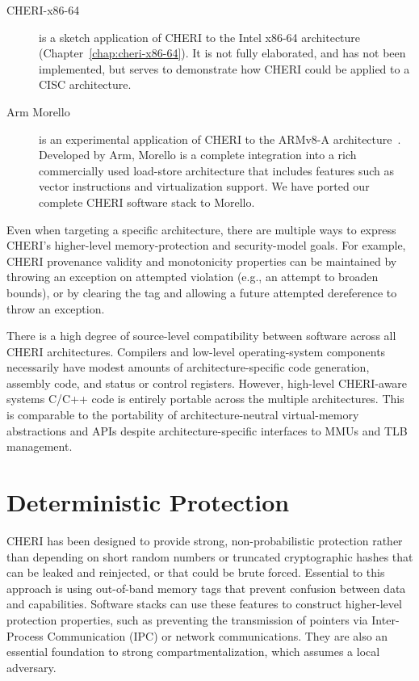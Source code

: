 \begin{description}
\item[CHERI-x86-64] is a sketch application of CHERI to the Intel x86-64
  architecture (Chapter~\ref{chap:cheri-x86-64}).
  It is not fully elaborated, and has not been implemented, but serves to
  demonstrate how CHERI could be applied to a CISC architecture.

\item[Arm Morello] is an experimental application of CHERI to the ARMv8-A
  architecture~\cite{arm-morello}.  Developed by Arm, Morello is a complete
  integration into
  a rich commercially used load-store architecture that includes features
  such as vector instructions and virtualization support.
  We have ported our complete CHERI software stack to Morello.
\end{description}

Even when targeting a specific architecture, there are multiple ways to
express CHERI's higher-level memory-protection and security-model goals.
For example,
CHERI provenance validity and monotonicity properties can be maintained by
throwing an exception on attempted violation (e.g., an attempt to broaden
bounds), or by clearing the tag and allowing a future attempted dereference
to throw an exception.

There is a high degree of source-level compatibility between software across
all CHERI architectures.
Compilers and low-level operating-system components necessarily have modest
amounts of architecture-specific code generation, assembly code, and status
or control registers.
However, high-level CHERI-aware systems C/C++ code is entirely portable across
the multiple architectures.
This is comparable to the portability of architecture-neutral virtual-memory
abstractions and APIs despite architecture-specific interfaces to MMUs and
TLB management.

\section{Deterministic Protection}

CHERI has been designed to provide strong, non-probabilistic protection rather
than depending on short random numbers or truncated cryptographic hashes that
can be leaked and reinjected, or that could be brute forced.
Essential to this approach is using out-of-band memory tags that prevent
confusion between data and capabilities.
Software stacks can use these features to construct higher-level protection
properties, such as preventing the transmission of pointers via Inter-Process
Communication (IPC) or network communications.
They are also an essential foundation to strong compartmentalization, which
assumes a local adversary.

